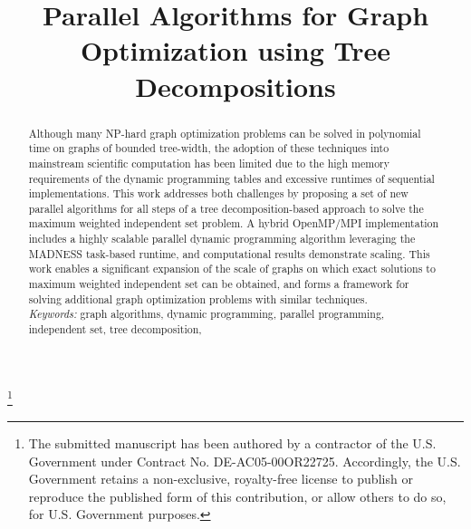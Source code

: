 \documentclass[conference]{IEEEtran}
\begin{document}
\title{Parallel Algorithms for Graph Optimization using Tree Decompositions}
\author{
\and
{}
\and
{}
}
\maketitle
\footnote{The submitted manuscript has been authored by a contractor of the U.S. Government under
Contract No. DE-AC05-00OR22725. Accordingly, the U.S. Government retains a non-exclusive,
royalty-free license to publish or reproduce the published form of this contribution, or
allow others to do so, for U.S. Government purposes.}
\begin{abstract}
Although many NP-hard graph optimization problems can be solved in
polynomial time on graphs of bounded tree-width, the adoption of these
techniques into mainstream scientific computation has been limited due
to the high memory requirements of the dynamic programming tables
and excessive runtimes of sequential implementations.  This work
addresses both challenges by proposing a set of new parallel
algorithms for all steps of a tree decomposition-based approach to
solve the maximum weighted independent set problem.  A hybrid OpenMP/MPI
implementation includes a highly scalable parallel dynamic programming
algorithm leveraging the MADNESS task-based runtime, and computational
results demonstrate scaling. This work enables a significant expansion
of the scale of graphs on which exact solutions to maximum weighted
independent set can be obtained, and forms a framework for solving
additional graph optimization problems with similar techniques.
\\
\emph{Keywords:} {graph algorithms, dynamic programming, parallel programming,
  independent set, tree decomposition, }
\end{abstract}
\IEEEpeerreviewmaketitle
\end{document}
